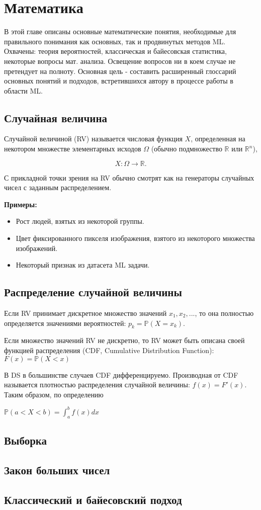 \chapter{Математика}

В этой главе описаны основные математические понятия, необходимые для правильного понимания как основных, так и продвинутых методов ML. Охвачены: теория вероятностей, классическая и байесовская статистика, некоторые вопросы мат. анализа. Освещение вопросов ни в коем случае не претендует на полноту. Основная цель - составить расширенный глоссарий основных понятий и подходов, встретившихся автору в процессе работы в области ML.


\section{Случайная величина}

Случайной величиной (RV) называется числовая функция $X$, определенная на некотором множестве элементарных исходов $\Omega$ (обычно подмножество $\mathbb{R}$ или $\mathbb{R}^n$), 

$$
X: \Omega\rightarrow\mathbb{R}.
$$

С прикладной точки зрения на RV обычно смотрят как на генераторы случайных чисел с заданным распределением.

\textbf{Примеры:}
\begin{itemize}
    \item Рост людей, взятых из некоторой группы.
    \item Цвет фиксированного пикселя изображения, взятого из некоторого множества изображений.
    \item Некоторый признак из датасета ML задачи.
\end{itemize}


\section{Распределение случайной величины}

Если RV принимает дискретное множество значений $x_1,x_2,...$, то она полностью определяется значениями вероятностей: $p_k=\mathbb{P}(X=x_k)$.

Если множество значений RV не дискретно, то RV может быть описана своей функцией распределения (CDF, Cumulative Distribution Function): $F(x)=\mathbb{P}(X<x)$

В DS в большинстве случаев CDF дифференцируемо. Производная от CDF называется плотностью распределения случайной величины: $f(x)=F'(x)$. Таким образом, по определению 

$\mathbb{P}(a<X<b)=\int_{a}^{b}f(x)dx$

\section{Выборка}

\section{Закон больших чисел}

\section{Классический и байесовский подход}
